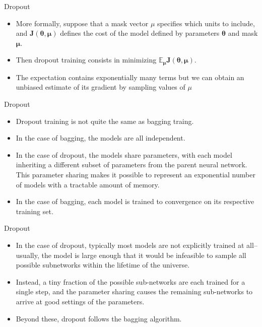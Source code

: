 \documentclass[10pt]{beamer}
\begin{document}
	\begin{frame}{Dropout}
		\begin{itemize}
			\item More formally, suppose that a mask vector $\mu$ specifies which units to include, and $\bm{J}(\bm{\theta},\bm{\mu})$ defines the cost of the model defined by parameters $\bm{\theta}$ and mask $\bm{\mu}$.
			\pause
			\item Then dropout training consists in minimizing $\mathbb{E}_{\bm{\mu}}\bm{J}(\bm{\theta},\bm{\mu})$.
			\pause
			\item The expectation contains exponentially many terms but we can obtain an unbiased estimate of its gradient by sampling values of $\mu$
		\end{itemize}
	\end{frame}
	
	\begin{frame}{Dropout}
		\begin{itemize}
			\item Dropout training is not quite the same as bagging traing.
			\pause
			\item In the case of bagging, the models are all independent.
			\pause
			\item In the case of dropout, the models share parameters, with each model inheriting a different subset of parameters from the parent neural network. This parameter sharing makes it possible to represent an exponential number of models with a tractable amount of memory.
			\pause
			\item In the case of bagging, each model is trained to convergence on its respective training set.
		\end{itemize}
	\end{frame}
	
	\begin{frame}{Dropout}
		\begin{itemize}
			\item In the case of dropout, typically most models are not explicitly trained at all--usually, the model is large enough that it would be infeasible to sample all possible subnetworks within the lifetime of the universe.
			\pause
			\item Instead, a tiny fraction of the possible sub-networks are each trained for a single step, and the parameter sharing causes the remaining sub-networks to arrive at good settings of the parameters.
			\pause
			\item Beyond these, dropout follows the bagging algorithm.
		\end{itemize}
	\end{frame}
	
\end{document}
